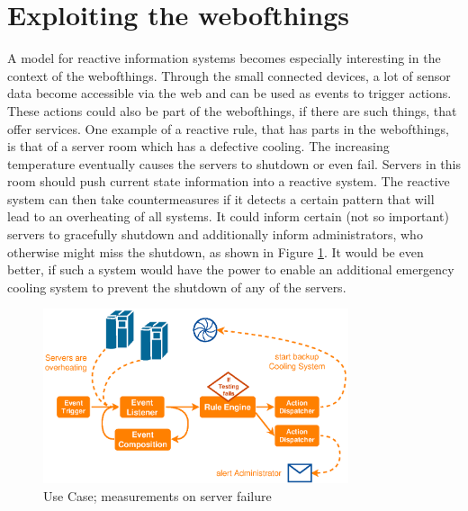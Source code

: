 \section{Exploiting the \gls{webofthings}}
A model for reactive information systems becomes especially interesting in the context of the \textrm{\gls{webofthings}}. 
Through the small connected devices, a lot of sensor data become accessible via the \textrm{\gls{web}} and can be used as events to trigger actions.
These actions could also be part of the \textrm{\gls{webofthings}}, if there are such things, that offer services.
One example of a reactive rule, that has parts in the \textrm{\gls{webofthings}}, is that of a server room which has a defective cooling.
The increasing temperature eventually causes the servers to shutdown or even fail.
Servers in this room should push current state information into a reactive system.
The reactive system can then take countermeasures if it detects a certain pattern that will lead to an overheating of all systems.
It could inform certain (not so important) servers to gracefully shutdown and additionally inform administrators, who otherwise might miss the shutdown, as shown in Figure \ref{fig:WoT_Server}.
It would be even better, if such a system would have the power to enable an additional emergency cooling system to prevent the shutdown of any of the servers.
\begin{figure}[!ht]
  \centering
  \includegraphics[width=0.8\textwidth]{figures/WoT_Server}
  \caption{Use Case; measurements on server failure}
  \label{fig:WoT_Server}
\end{figure}


